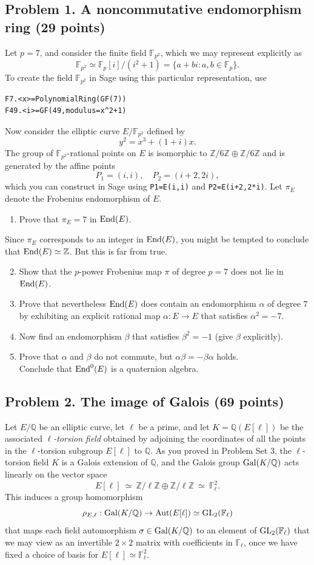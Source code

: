 \documentclass[11pt]{article}
\newcommand{\Fl}{\mathbb{F}_\ell}
\newcommand{\Fp}{\mathbb{F}_p}
\newcommand{\Fptwo}{\mathbb{F}_{p^2}}
\newcommand{\Q}{\mathbb{Q}}
\newcommand{\Z}{\mathbb{Z}}
\newcommand{\Aut}{{\rm Aut}}
\newcommand{\End}{{\rm End}}
\newcommand{\Gal}{{\rm Gal}}
\newcommand{\GL}{{\rm GL}}
\theoremstyle{definition}
\begin{document}
\subsection*{Problem 1.  A noncommutative endomorphism ring (29 points)}
Let $p=7$, and consider the finite field $\Fptwo$, which we may represent explicitly as
\[
\Fptwo\simeq \Fp[i]/(i^2+1)=\{a+bi:a,b\in\Fp\}.
\]
To create the field $\Fptwo$ in Sage using this particular representation, use
\begin{lstlisting}
F7.<x>=PolynomialRing(GF(7))
F49.<i>=GF(49,modulus=x^2+1)
\end{lstlisting}
Now consider the elliptic curve $E/\Fptwo$ defined by
\[
y^2=x^3+(1+i)x.
\]
The group of $\Fptwo$-rational points on $E$ is isomorphic to $\Z/6\Z \oplus \Z/6\Z$ and is
generated by the affine points
\[
P_1 = (i,i), \quad P_2=(i+2,2i),
\]
which you can construct in Sage using \texttt{P1=E(i,i)} and \texttt{P2=E(i+2,2*i)}.
Let $\pi_E$ denote the Frobenius endomorphism of $E$.

\begin{enumerate}[{\bf (a)}]
\item
Prove that $\pi_E=7$ in $\End(E)$.
\end{enumerate}
Since $\pi_E$ corresponds to an integer in $\End(E)$, you might be tempted to conclude that $\End(E)\simeq\Z$.
But this is far from true.
\begin{enumerate}[{\bf (a)}]
\setcounter{enumi}{1}
\item
Show that the $p$-power Frobenius map $\pi$ of degree $p=7$ does not lie in $\End(E)$.
\item
Prove that nevertheless $\End(E)$ does contain an endomorphism $\alpha$ of degree $7$ by exhibiting an explicit rational map $\alpha\colon E\to E$ that satisfies $\alpha^2=-7$.
\item
Now find an endomorphism $\beta$ that satisfies $\beta^2=-1$ (give $\beta$ explicitly).
\item
Prove that $\alpha$ and $\beta$ do not commute, but $\alpha\beta=-\beta\alpha$ holds.\\
Conclude that $\End^0(E)$ is a quaternion algebra.
\end{enumerate}

\subsection*{Problem 2.  The image of Galois (69 points)}
Let $E/\Q$ be an elliptic curve, let $\ell$ be a prime, and let $K=\Q(E[\ell])$ be the associated \emph{$\ell$-torsion field} obtained by adjoining the coordinates of all the points in the $\ell$-torsion subgroup $E[\ell]$ to $\Q$.  As you proved in Problem Set 3, the $\ell$-torsion field $K$ is a Galois extension of $\Q$, and the Galois group $\Gal(K/\Q)$ acts linearly on the vector space
\[
E[\ell]\ \simeq\ \Z/\ell\Z\oplus \Z/\ell\Z\ \simeq\ \Fl^2.
\]
This induces a group homomorphism
\[
\rho_{E,\ell}:\Gal(K/\Q)\to \Aut(E[\ell])\simeq \GL_2(\Fl)
\]
that maps each field automorphism $\sigma\in\Gal(K/\Q)$ to an element of $\GL_2(\Fl)$ that we may view as an invertible $2\times 2$ matrix with coefficients in $\Fl$, once we have fixed a choice of basis for $E[\ell]\simeq \Fl^2$.
\end{document}
